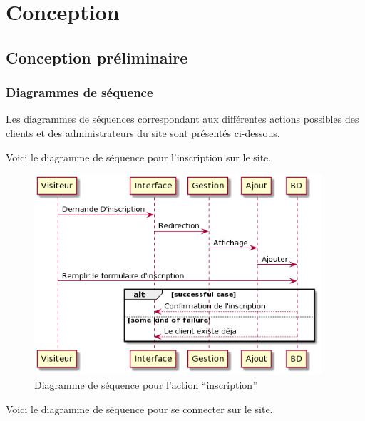 \section{Conception}
\subsection{Conception préliminaire}

\subsubsection{Diagrammes de séquence}
Les diagrammes de séquences correspondant aux différentes actions possibles des clients et des administrateurs du site sont présentés ci-dessous.

Voici le diagramme de séquence pour l'inscription sur le site.

\begin{figure}[H]
\begin{centering}
\includegraphics[width=0.95\textwidth,height=0.6\textheight]{Ressources/Inscription.png}
\caption{Diagramme de séquence pour l'action ``inscription''}
\par
\end{centering}
\end{figure}

\clearpage

Voici le diagramme de séquence pour se connecter sur le site.

